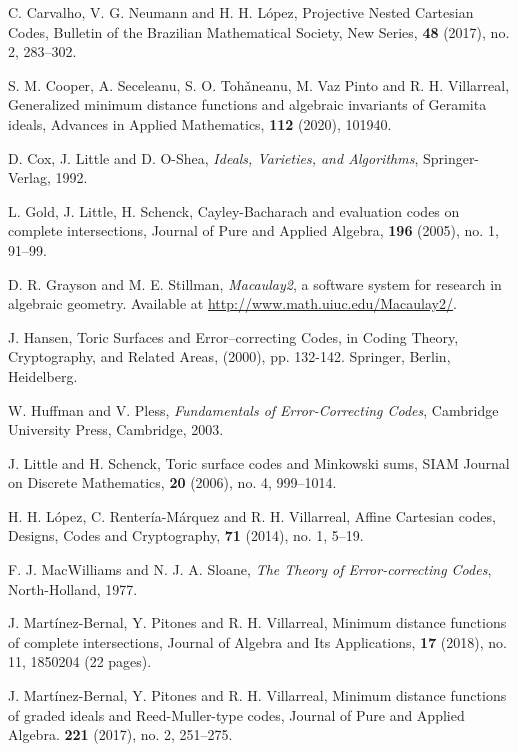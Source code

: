 \documentclass[12pt]{amsart}
\theoremstyle{plain}
\begin{document}
\begin{thebibliography}{99}

 C. Carvalho, V. G. Neumann and H. H. L\'opez,
Projective Nested Cartesian Codes,
Bulletin of the Brazilian Mathematical Society, New Series, {\bf 48} (2017), no. 2, 283--302.

 S. M. Cooper, A. Seceleanu, S. O. Toh\v{a}neanu, M. Vaz Pinto and R. H. Villarreal, 
Generalized minimum distance functions and algebraic invariants of Geramita ideals,
Advances in Applied Mathematics, {\bf 112} (2020), 101940.

D. Cox, J. Little and D. O-Shea,
{\it Ideals, Varieties, and Algorithms}, Springer-Verlag, 1992.

 L. Gold, J. Little, H. Schenck,
Cayley-Bacharach and evaluation codes on complete intersections,
Journal of Pure and Applied Algebra, {\bf 196} (2005), no. 1, 91--99.

 D. R. Grayson and M. E. Stillman,
{\it Macaulay2}, a software system for research in algebraic geometry.
Available at \url{http://www.math.uiuc.edu/Macaulay2/}.

 J. Hansen,
Toric Surfaces and Error--correcting Codes,
in Coding Theory, Cryptography, and Related Areas, (2000), pp. 132-142. Springer, Berlin, Heidelberg.

 W. Huffman and V. Pless,
{\it Fundamentals of Error-Correcting Codes},
Cambridge University Press, Cambridge, 2003.

 J. Little and H. Schenck,
Toric surface codes and Minkowski sums,
SIAM Journal on Discrete Mathematics, {\bf  20}  (2006),  no. 4, 999--1014.

 H. H. L\'opez, C. Renter\'ia-M\'arquez and R. H. Villarreal,
Affine Cartesian codes,
{Designs, Codes and Cryptography}, {\bf 71} (2014), no. 1, 5--19.

 F. J. MacWilliams and N. J. A. Sloane, 
{\it The Theory of Error-correcting Codes}, North-Holland, 1977.

 J. Mart\'inez-Bernal, Y. Pitones and R. H. Villarreal,
Minimum distance functions of complete intersections,
Journal of Algebra and Its Applications, {\bf 17} (2018), no. 11, 1850204 (22 pages).

 J. Mart\'inez-Bernal, Y. Pitones and R. H. Villarreal,
Minimum distance functions of graded ideals and Reed-Muller-type codes,
Journal of Pure and Applied Algebra. {\bf 221} (2017), no. 2, 251--275.


\end{thebibliography}
\end{document}
